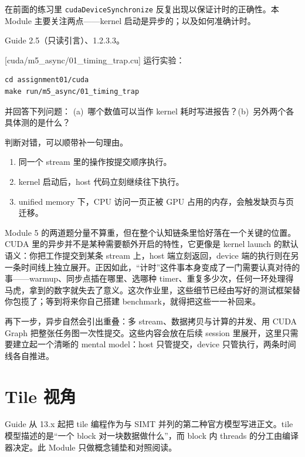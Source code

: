 \documentclass[11pt,a4paper,fontset=none]{ctexart}
\begin{document}
在前面的练习里 \texttt{cudaDeviceSynchronize} 反复出现以保证计时的正确性。本 Module 主要关注两点——kernel 启动是异步的；以及如何准确计时。

\begin{reading}
Guide 2.5（只读引言）、1.2.3.3。
\end{reading}

[cuda/m5\_async/01\_timing\_trap.cu]
运行实验：

\begin{lstlisting}
cd assignment01/cuda
make run/m5_async/01_timing_trap
\end{lstlisting}

并回答下列问题：
(a)~哪个数值可以当作 kernel 耗时写进报告？(b)~另外两个各具体测的是什么？

判断对错，可以顺带补一句理由。
\begin{enumerate}[label=(\alph*)]
  \item 同一个 stream 里的操作按提交顺序执行。
  \item kernel 启动后，host 代码立刻继续往下执行。
  \item unified memory 下，CPU 访问一页正被 GPU 占用的内存，会触发缺页与页迁移。
\end{enumerate}

\begin{lookback}
Module 5 的两道题分量不算重，但在整个认知链条里恰好落在一个关键的位置。CUDA 里的异步并不是某种需要额外开启的特性，它更像是 kernel launch 的默认语义：你把工作提交到某条 stream 上，host 端立刻返回，device 端的执行则在另一条时间线上独立展开。正因如此，“计时”这件事本身变成了一门需要认真对待的事——warmup、同步点插在哪里、选哪种 timer、重复多少次，任何一环处理得马虎，拿到的数字就失去了意义。这次作业里，这些细节已经由写好的测试框架替你包揽了；等到将来你自己搭建 benchmark，就得把这些一一补回来。

再下一步，异步自然会引出重叠：多 stream、数据拷贝与计算的并发、用 CUDA Graph 把整张任务图一次性提交。这些内容会放在后续 session 里展开，这里只需要建立起一个清晰的 mental model：host 只管提交，device 只管执行，两条时间线各自推进。
\end{lookback}

\section{Tile 视角}

Guide 从 13.x 起把 tile 编程作为与 SIMT 并列的第二种官方模型写进正文。tile 模型描述的是“一个 block 对一块数据做什么”，而 block 内 threads 的分工由编译器决定。此 Module 只做概念铺垫和对照阅读。
\end{document}
